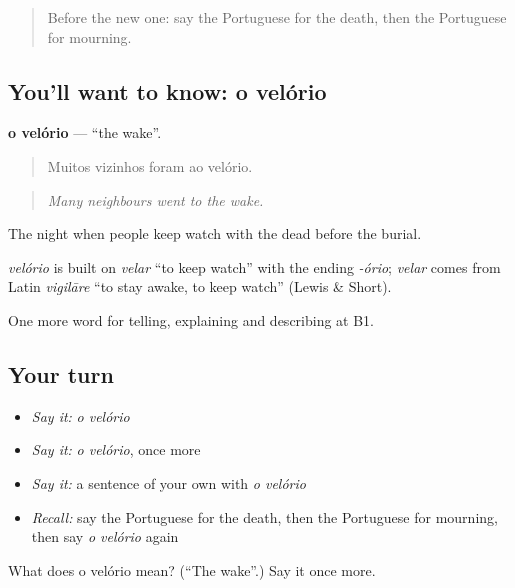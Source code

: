 \label{lesson:PT-C314-velorio}



\begin{quote}
Before the new one: say the Portuguese for the death, then the Portuguese for mourning.
\end{quote}

\subsection*{You'll want to know: o velório}
\textbf{o velório} — \textquotedblleft{}the wake\textquotedblright{}.

\begin{quote}
Muitos vizinhos foram ao velório.
\end{quote}

\begin{quote}
\emph{Many neighbours went to the wake.}
\end{quote}

The night when people keep watch with the dead before the burial.

\begin{cousinweb}
\emph{velório} is built on \emph{velar} \textquotedblleft{}to keep watch\textquotedblright{} with the ending \emph{-ório}; \emph{velar} comes from Latin \emph{vigilāre} \textquotedblleft{}to stay awake, to keep watch\textquotedblright{} (Lewis \& Short).
\end{cousinweb}

\begin{grammarlens}[title={What you've built}]
One more word for telling, explaining and describing at B1.
\end{grammarlens}

\subsection*{Your turn}
\begin{itemize}
\raggedright
  \item \emph{Say it:} \emph{o velório}
  \item \emph{Say it:} \emph{o velório}, once more
  \item \emph{Say it:} a sentence of your own with \emph{o velório}
  \item \emph{Recall:} say the Portuguese for the death, then the Portuguese for mourning, then say \emph{o velório} again
\end{itemize}

\begin{tcolorbox}[breakable,colback=teal!4,colframe=teal!35!black,title={Before you move on}]
What does o velório mean? (\textquotedblleft{}The wake\textquotedblright{}.) Say it once more.
\end{tcolorbox}
